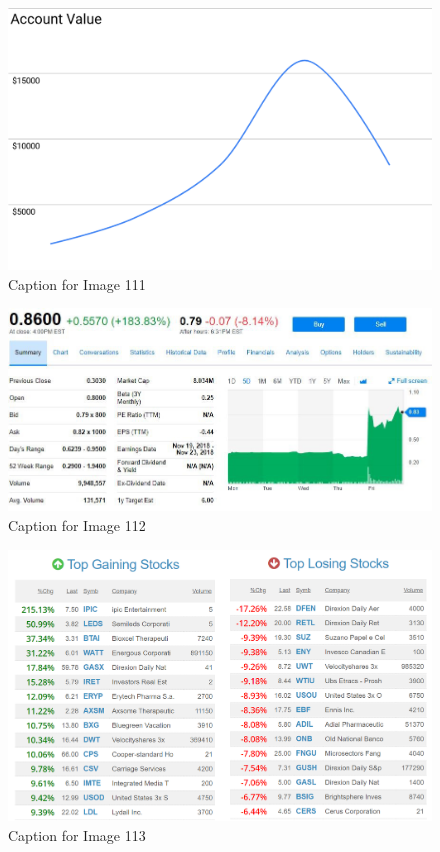 \documentclass{article}
\begin{document}
\vspace{10pt}

\begin{figure}[!htb]
    \centering
    \includegraphics[width=\textwidth]{imgs/111.png}
    \caption{Caption for Image 111}
\end{figure}

\vspace{10pt}

\begin{figure}[!htb]
    \centering
    \includegraphics[width=\textwidth]{imgs/112.png}
    \caption{Caption for Image 112}
\end{figure}

\vspace{10pt}

\begin{figure}[!htb]
    \centering
    \includegraphics[width=\textwidth]{imgs/113.png}
    \caption{Caption for Image 113}
\end{figure}
\end{document}
